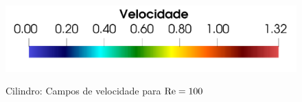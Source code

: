 \documentclass[tese_patricia]{subfiles}%
\begin{document}
\begin{figure}[htb!]
	 \\
	{\includegraphics[trim=0cm 0cm 0cm 0cm,clip=true,scale=0.3]{Imagens/Cap2/cilindro_legendaVel.pdf}} \\
	\caption{Cilindro: Campos de velocidade para $\mathrm{Re} = 100$}
	\label{fig:cilindro_camposVel}
\end{figure}
\end{document}
